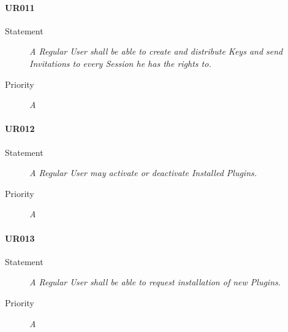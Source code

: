 \paragraph{UR011}
\begin{description}
  \item [Statement] 
    \textit{A \gls{Regular User} shall be able to create and distribute \gls{Keys} and send \gls{Invitations} to every \gls{Session} he has the rights to.}
  \item [Priority] \textit{A}
\end{description}

\paragraph{UR012}
\begin{description}
  \item [Statement] 
    \textit{A \gls{Regular User} may activate or deactivate \gls{Installed Plugins}.}
  \item [Priority] \textit{A}
\end{description}

\paragraph{UR013}
\begin{description}
  \item [Statement] 
    \textit{A \gls{Regular User} shall be able to request installation of new \gls{Plugins}.}
  \item [Priority] \textit{A}
\end{description}
